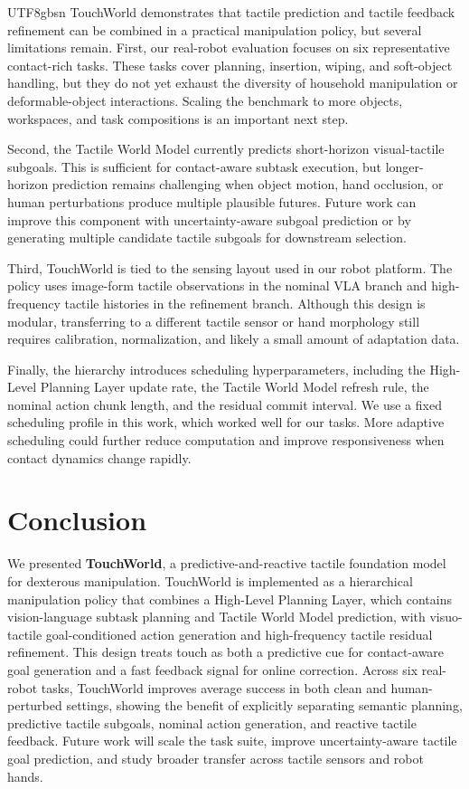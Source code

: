 \documentclass[]{mpai_report}
\begin{document}
\begin{CJK*}{UTF8}{gbsn}
TouchWorld demonstrates that tactile prediction and tactile feedback refinement can be combined in a practical manipulation policy, but several limitations remain.
First, our real-robot evaluation focuses on six representative contact-rich tasks.
These tasks cover planning, insertion, wiping, and soft-object handling, but they do not yet exhaust the diversity of household manipulation or deformable-object interactions.
Scaling the benchmark to more objects, workspaces, and task compositions is an important next step.

Second, the Tactile World Model currently predicts short-horizon visual-tactile subgoals.
This is sufficient for contact-aware subtask execution, but longer-horizon prediction remains challenging when object motion, hand occlusion, or human perturbations produce multiple plausible futures.
Future work can improve this component with uncertainty-aware subgoal prediction or by generating multiple candidate tactile subgoals for downstream selection.

Third, TouchWorld is tied to the sensing layout used in our robot platform.
The policy uses image-form tactile observations in the nominal VLA branch and high-frequency tactile histories in the refinement branch.
Although this design is modular, transferring to a different tactile sensor or hand morphology still requires calibration, normalization, and likely a small amount of adaptation data.

Finally, the hierarchy introduces scheduling hyperparameters, including the High-Level Planning Layer update rate, the Tactile World Model refresh rule, the nominal action chunk length, and the residual commit interval.
We use a fixed scheduling profile in this work, which worked well for our tasks.
More adaptive scheduling could further reduce computation and improve responsiveness when contact dynamics change rapidly.

\section{Conclusion}

We presented \textbf{TouchWorld}, a predictive-and-reactive tactile foundation model for dexterous manipulation.
TouchWorld is implemented as a hierarchical manipulation policy that combines a High-Level Planning Layer, which contains vision-language subtask planning and Tactile World Model prediction, with visuo-tactile goal-conditioned action generation and high-frequency tactile residual refinement.
This design treats touch as both a predictive cue for contact-aware goal generation and a fast feedback signal for online correction.
Across six real-robot tasks, TouchWorld improves average success in both clean and human-perturbed settings, showing the benefit of explicitly separating semantic planning, predictive tactile subgoals, nominal action generation, and reactive tactile feedback.
Future work will scale the task suite, improve uncertainty-aware tactile goal prediction, and study broader transfer across tactile sensors and robot hands.


\end{CJK*}
\end{document}
